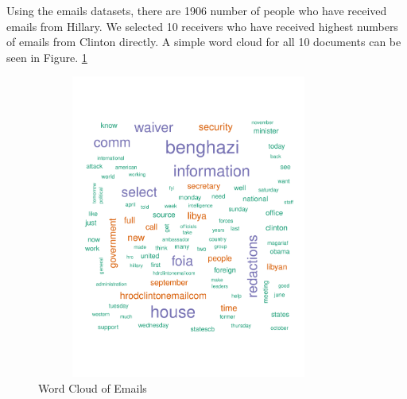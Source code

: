 Using the emails datasets, there are 1906 number of people who have received emails from Hillary. We selected 10 receivers who have received highest numbers of emails from Clinton directly.
A simple word cloud for all 10 documents can be seen in Figure. \ref{fig:wcloud}
\begin{figure}[h!]
    \centering
    \includegraphics[width=10cm,height=10cm]
    {daitong_and_yihe/wcloud}
    \caption{Word Cloud of Emails}
    \label{fig:wcloud}
\end{figure}

\newpage
